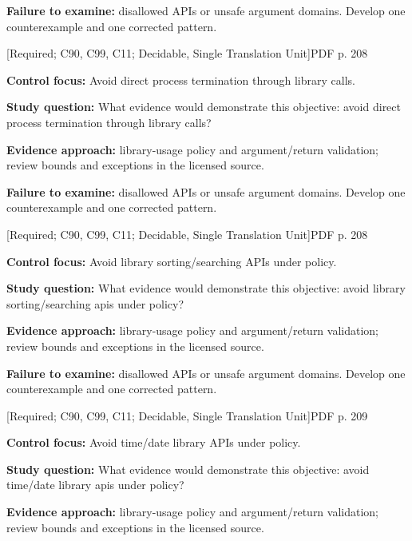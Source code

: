 \documentclass[10pt,letterpaper]{article}
\begin{document}
\textbf{Failure to examine:} disallowed APIs or unsafe argument domains. Develop one counterexample and one corrected pattern.\par
\smallskip
{}
 \textsf{\footnotesize [Required; C90, C99, C11; Decidable, Single Translation Unit]}\hfill{\footnotesize PDF p. 208}\par
\textbf{Control focus:} Avoid direct process termination through library calls.\par
\textbf{Study question:} What evidence would demonstrate this objective: avoid direct process termination through library calls?\par
\textbf{Evidence approach:} library-usage policy and argument/return validation; review bounds and exceptions in the licensed source.\par
\textbf{Failure to examine:} disallowed APIs or unsafe argument domains. Develop one counterexample and one corrected pattern.\par
\smallskip
{}
 \textsf{\footnotesize [Required; C90, C99, C11; Decidable, Single Translation Unit]}\hfill{\footnotesize PDF p. 208}\par
\textbf{Control focus:} Avoid library sorting/searching APIs under policy.\par
\textbf{Study question:} What evidence would demonstrate this objective: avoid library sorting/searching apis under policy?\par
\textbf{Evidence approach:} library-usage policy and argument/return validation; review bounds and exceptions in the licensed source.\par
\textbf{Failure to examine:} disallowed APIs or unsafe argument domains. Develop one counterexample and one corrected pattern.\par
\smallskip
{}
 \textsf{\footnotesize [Required; C90, C99, C11; Decidable, Single Translation Unit]}\hfill{\footnotesize PDF p. 209}\par
\textbf{Control focus:} Avoid time/date library APIs under policy.\par
\textbf{Study question:} What evidence would demonstrate this objective: avoid time/date library apis under policy?\par
\textbf{Evidence approach:} library-usage policy and argument/return validation; review bounds and exceptions in the licensed source.\par
\end{document}
